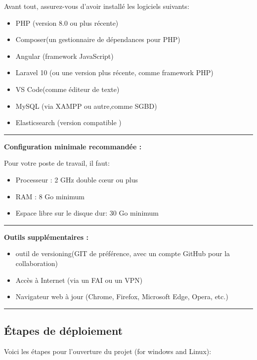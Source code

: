 Avant tout, assurez-vous d'avoir installé les logiciels suivants:

\begin{itemize}[label=--]
    \item PHP (version 8.0 ou plus récente)
    \item Composer(un gestionnaire de dépendances pour PHP)
    \item Angular (framework JavaScript)
    \item Laravel 10 (ou une version plus récente, comme framework PHP)
    \item VS Code(comme éditeur de texte)
    \item MySQL (via XAMPP ou autre,comme SGBD)
    \item Elasticsearch (version compatible )
    
\end{itemize}
\rule{\linewidth}{0.2pt}
\textbf{Configuration minimale recommandée :}

Pour votre poste de travail, il faut:

\begin{itemize}[label=--]
    \item Processeur : 2 GHz double cœur ou plus
    \item RAM : 8 Go minimum
    \item Espace libre sur le disque dur: 30 Go minimum
\end{itemize}
\rule{\linewidth}{0.2pt}
\textbf{Outils supplémentaires :}

\begin{itemize}[label=--]
    \item outil de versioning(GIT de préférence, avec un compte GitHub pour la collaboration)
    \item Accès à Internet (via un FAI ou un VPN)
    \item Navigateur web à jour (Chrome, Firefox, Microsoft Edge, Opera, etc.)
\end{itemize}
\rule{\linewidth}{0.2pt}
\subsection{Étapes de déploiement}

Voici les étapes pour l’ouverture du projet (for windows and Linux):

